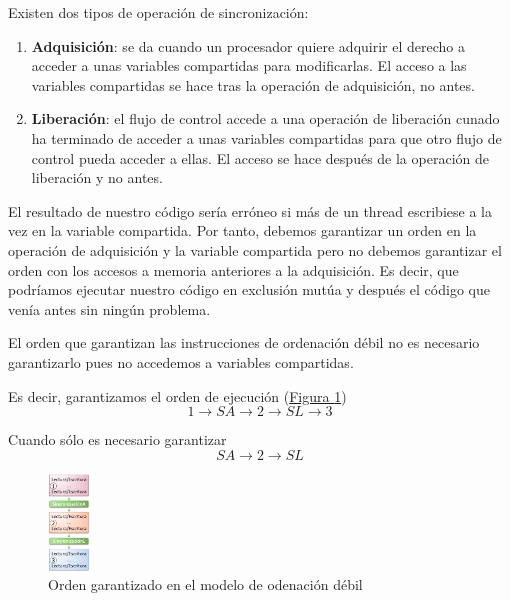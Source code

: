 \documentclass[10pt,a4paper,spanish]{report}
\begin{document}
Existen dos tipos de operación de sincronización:
\begin{enumerate}[\color{azul}{\bf $\heartsuit$}]
    \item \textcolor[rgb]{0.2,0.4,0.8}{\textbf{Adquisición}}: se da cuando un procesador quiere adquirir el derecho a acceder a unas variables compartidas para modificarlas. El acceso a las variables compartidas se hace tras la operación de adquisición, no antes.
    \item \textcolor[rgb]{0.2,0.4,0.8}{\textbf{Liberación}}: el flujo de control accede a una operación de liberación cunado ha terminado de acceder a unas variables compartidas para que otro flujo de control pueda acceder a ellas. El acceso se hace después de la operación de liberación y no antes.
\end{enumerate}

El resultado de nuestro código sería erróneo si más de un thread escribiese a la vez en la variable compartida. Por tanto, debemos garantizar un orden en la operación de adquisición y la variable compartida pero no debemos garantizar el orden con los accesos a memoria anteriores a la adquisición. Es decir, que podríamos ejecutar nuestro código en exclusión mutúa y después el código que venía antes sin ningún problema. 

El orden que garantizan las instrucciones de ordenación débil no es necesario garantizarlo pues no accedemos a variables compartidas.

Es decir, garantizamos el orden de ejecución (\hyperref[orden_ord_d]{Figura \ref*{orden_ord_d}})
\begin{displaymath}
1 \rightarrow SA \rightarrow 2 \rightarrow SL \rightarrow 3
\end{displaymath}

Cuando sólo es necesario garantizar
\begin{displaymath}
SA \rightarrow 2 \rightarrow SL
\end{displaymath}

\begin{figure}[!h]
\centering
\includegraphics[width=0.1\textwidth]{76}
\caption{Orden garantizado en el modelo de odenación débil}
\label{orden_ord_d}
\end{figure}
\end{document}
